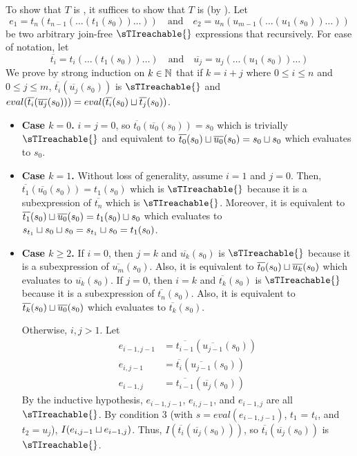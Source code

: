 \begin{elidableproof}
  \newcommand{\bart}[1]{\overline{t_{#1}}}
  \newcommand{\baru}[1]{\overline{u_{#1}}}
  \newcommand{\bartu}[2]{\bart{#1}(\baru{#2}(s_0))}

  To show that $T$ is \sTIconfluent{}, it suffices to show that $T$ is
  \sTImergereducible{} (by ).  Let
  \[
    e_1 = t_n(t_{n-1}(\ldots (t_1(s_0))\ldots))
    \quad \text{and} \quad
    e_2 = u_n(u_{m-1}(\ldots (u_1(s_0))\ldots))
  \]
  be two arbitrary join-free $\sTIreachable{}$ expressions that recursively.
  For ease of notation, let
  \[
    \bart{i} = t_i(\ldots(t_1(s_0))\ldots)
    \quad\text{and}\quad
    \baru{j} = u_j(\ldots(u_1(s_0))\ldots)
  \]
  We prove by strong induction on $k \in \mathbb{N}$ that if $k = i + j$ where $0
  \leq i \leq n$ and $0 \leq j \leq m$, $\bartu{i}{j}$ is $\sTIreachable{}$ and
  $eval(\bartu{i}{j}) = eval(\bart{i}(s_0) \join \bart{j}(s_0))$.
  \begin{itemize}
    \item \textbf{Case $k = 0$.}
      $i = j = 0$, so $\bartu{0}{0} = s_0$ which is trivially $\sTIreachable{}$
      and equivalent to $\bart{0}(s_0) \join \baru{0}(s_0) = s_0 \join s_0$
      which evaluates to $s_0$.

    \item \textbf{Case $k = 1$.}
      Without loss of generality, assume $i = 1$ and $j = 0$. Then,
      $
        \bartu{1}{0} = t_1(s_0)
      $ which is $\sTIreachable{}$ because it is a subexpression of $\bart{n}$
      which is $\sTIreachable{}$. Moreover, it is equivalent to $\bart{1}(s_0)
      \join \baru{0}(s_0) = t_1(s_0) \join s_0$ which evaluates to $s_{t_1}
      \sqcup s_0 \sqcup s_0 = s_{t_1} \sqcup s_0 = t_1(s_0)$.

    \item \textbf{Case $k \geq 2$.}
      If $i = 0$, then $j = k$ and $\baru{k}(s_0)$ is $\sTIreachable{}$ because
      it is a subexpression of $\baru{m}(s_0)$. Also, it is equivalent to
      $\bart{0}(s_0) \join \baru{k}(s_0)$ which evaluates to $\baru{k}(s_0)$.
      If $j = 0$, then $i = k$ and $\bart{k}(s_0)$ is $\sTIreachable{}$ because
      it is a subexpression of $\bart{n}(s_0)$. Also, it is equivalent to
      $\bart{k}(s_0) \join \baru{0}(s_0)$ which evaluates to $\bart{k}(s_0)$.

      Otherwise, $i, j > 1$. Let
      \begin{align*}
        e_{i-1,j-1} &= \bartu{i-1}{j-1} \\
        e_{i,j-1} &= \bartu{i}{j-1} \\
        e_{i-1,j} &= \bartu{i-1}{j}
      \end{align*}
      By the inductive hypothesis, $e_{i-1,j-1}$, $e_{i,j-1}$, and $e_{i-1,j}$
      are all $\sTIreachable{}$. By condition 3 (with $s = eval(e_{i-1,j-1})$,
      $t_1$ = $t_i$, and $t_2 = u_j$), $I(e_{i,j-1} \sqcup e_{i-1,j})$. Thus,
      $I(\bartu{i}{j})$, so $\bartu{i}{j}$ is $\sTIreachable{}$.
  \end{itemize}
\end{elidableproof}
